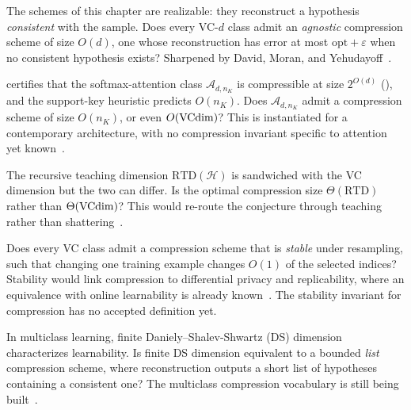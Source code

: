 \begin{openprob}
\label{op:agnostic-compression}
The schemes of this chapter are realizable: they reconstruct a hypothesis
\emph{consistent} with the sample.  Does every VC-$d$ class admit an
\emph{agnostic} compression scheme of size $O(d)$, one whose reconstruction has
error at most $\mathrm{opt} + \varepsilon$ when no consistent hypothesis
exists?  Sharpened by David, Moran, and
Yehudayoff~\cite{DavidMoranYehudayoff2016}.
\end{openprob}

\begin{openprob}
\label{op:attention-compression}
 certifies that the softmax-attention class
$\mathcal{A}_{d,n_K}$ is compressible at size $2^{O(d)}$
(), and the support-key heuristic predicts
$O(n_K)$.  Does $\mathcal{A}_{d,n_K}$ admit a compression scheme of size
$O(n_K)$, or even $O(\mathrm{VCdim})$?  This is  instantiated for a
contemporary architecture, with no compression invariant specific to attention
yet known~\cite{MoranYehudayoff2016}.
\end{openprob}

\begin{openprob}
\label{op:rtd}
The recursive teaching dimension $\mathrm{RTD}(\mathcal{H})$ is sandwiched with
the VC dimension but the two can differ.  Is the optimal compression size
$\Theta(\mathrm{RTD})$ rather than $\Theta(\mathrm{VCdim})$?  This would re-route the
conjecture through teaching rather than shattering~\cite{SimonZilles2015}.
\end{openprob}

\begin{openprob}
\label{op:stable-compression}
Does every VC class admit a compression scheme that is \emph{stable} under
resampling, such that changing one training example changes $O(1)$ of the selected
indices?  Stability would link compression to differential privacy and
replicability, where an equivalence with online learnability is already
known~\cite{BunLivniMoran2020}.  The stability invariant for compression has no
accepted definition yet.
\end{openprob}

\begin{openprob}
\label{op:list-compression}
In multiclass learning, finite Daniely--Shalev-Shwartz (DS) dimension
characterizes learnability.  Is finite DS dimension equivalent to a bounded
\emph{list} compression scheme, where reconstruction outputs a short list of
hypotheses containing a consistent one?  The multiclass compression vocabulary
is still being built~\cite{BrukhimCarmonDinurMoranYehudayoff2022}.
\end{openprob}

